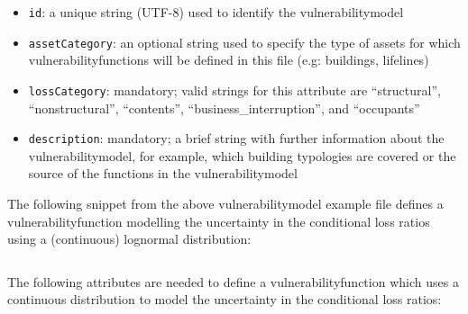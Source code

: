 \begin{itemize}

    \item \Verb+id+: a unique string (UTF-8) used to identify the \gls{vulnerabilitymodel}

    \item \Verb+assetCategory+: an optional string used to specify the type of
    \glspl{asset} for which \glspl{vulnerabilityfunction} will be defined in this file 
    (e.g: buildings, lifelines)

    \item \Verb+lossCategory+: mandatory; valid strings for this attribute are 
    ``structural'', ``nonstructural'', ``contents'',  
    ``business\_interruption'', and ``occupants''

    \item \Verb+description+: mandatory; a brief string with further information about the
    \gls{vulnerabilitymodel}, for example, which building typologies are 
    covered or the source of the functions in the \gls{vulnerabilitymodel}

\end{itemize}


The following snippet from the above \gls{vulnerabilitymodel} example file defines
a \gls{vulnerabilityfunction} modelling the uncertainty in the conditional loss
ratios using a (continuous) lognormal distribution:

\inputminted[firstline=10,firstnumber=10,lastline=14,fontsize=\footnotesize,frame=single,linenos,bgcolor=lightgray]{xml}{oqum/risk/Verbatim/input_vulnerability.xml}

The following attributes are needed to define a \gls{vulnerabilityfunction} which
uses a continuous distribution to model the uncertainty in the conditional
loss ratios:

